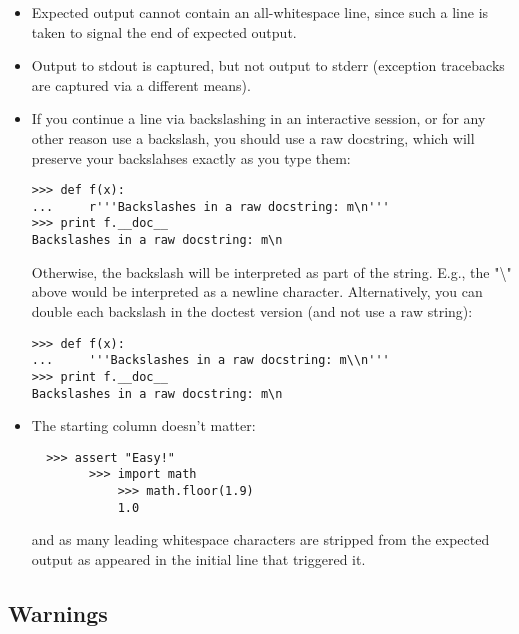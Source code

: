 \begin{itemize}

\item Expected output cannot contain an all-whitespace line, since such a
  line is taken to signal the end of expected output.

\item Output to stdout is captured, but not output to stderr (exception
  tracebacks are captured via a different means).

\item If you continue a line via backslashing in an interactive session,
  or for any other reason use a backslash, you should use a raw
  docstring, which will preserve your backslahses exactly as you type
  them:

\begin{verbatim}
>>> def f(x):
...     r'''Backslashes in a raw docstring: m\n'''
>>> print f.__doc__
Backslashes in a raw docstring: m\n
\end{verbatim}

  Otherwise, the backslash will be interpreted as part of the string.
  E.g., the "\textbackslash" above would be interpreted as a newline
  character.  Alternatively, you can double each backslash in the
  doctest version (and not use a raw string):

\begin{verbatim}
>>> def f(x):
...     '''Backslashes in a raw docstring: m\\n'''
>>> print f.__doc__
Backslashes in a raw docstring: m\n
\end{verbatim}

\item The starting column doesn't matter:

\begin{verbatim}
  >>> assert "Easy!"
        >>> import math
            >>> math.floor(1.9)
            1.0
\end{verbatim}

and as many leading whitespace characters are stripped from the
expected output as appeared in the initial  line
that triggered it.
\end{itemize}

\subsection{Warnings}

